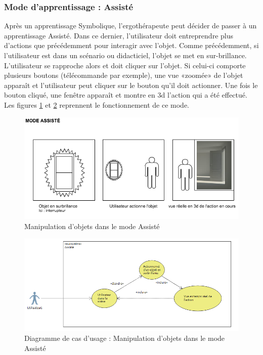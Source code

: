 \subsubsection{Mode d'apprentissage : Assisté}

Après un apprentissage Symbolique, l'ergothérapeute peut décider de passer à un apprentissage Assisté. Dans ce dernier, l'utilisateur doit entreprendre plus d'actions que précédemment pour interagir avec l'objet. Comme précédemment, si l'utilisateur est dans un scénario ou didacticiel, l'objet se met en sur-brillance. L'utilisateur se rapproche alors et doit cliquer sur l'objet. Si celui-ci comporte plusieurs boutons (télécommande par exemple), une vue «zoomée» de l'objet apparaît et l'utilisateur peut cliquer sur le bouton qu'il doit actionner. Une fois le bouton cliqué, une fenêtre apparaît et montre en 3d l'action qui a été effectué. 
\newline
Les figures \ref{fig:MaquetteAssiste} et \ref{fig:CasUsageAssiste} reprennent le fonctionnement de ce mode.

\begin{figure}[h]
\centering
\includegraphics[width=1\textwidth]{2-Specifications/img-utilisateur/assiste.png}
\caption{\label{fig:MaquetteAssiste} Manipulation d'objets dans le mode Assisté }
\end{figure}
\begin{figure}[h]
\centering
\includegraphics[width=1\textwidth]{2-Specifications/img-utilisateur/cas-usage-assiste.png}
\caption{\label{fig:CasUsageAssiste} Diagramme de cas d'usage : Manipulation d'objets dans le mode Assisté }
\end{figure}
\FloatBarrier 


